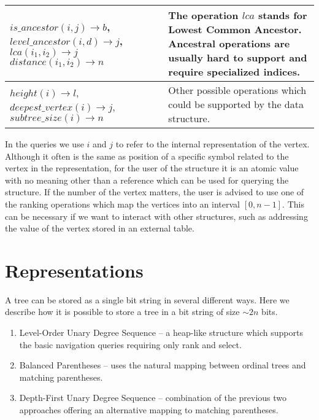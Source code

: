 \begin{tabularx}{\textwidth}{|L{0.7}|L{1.3}|}
	$is\_ancestor(i, j) \rightarrow b$, \newline
	$level\_ancestor(i, d) \rightarrow j$, \newline
	$lca(i_1, i_2) \rightarrow j$
	$distance(i_1, i_2) \rightarrow n$
	& The operation $lca$ stands for Lowest Common Ancestor.
	Ancestral operations are usually hard to support and require specialized indices. \\ \hline
	
	$height(i) \rightarrow l$, \newline
	$deepest\_vertex(i) \rightarrow j$, \newline
	$subtree\_size(i) \rightarrow n$
	& Other possible operations which could be supported by the data structure. \\ \hline
\end{tabularx}

In the queries we use $i$ and $j$ to refer to the internal representation of the vertex.
Although it often is the same as position of a specific symbol related to the vertex in the representation, for the user of the structure it is an atomic value with no meaning other than a reference which can be used for querying the structure.
If the number of the vertex matters, the user is advised to use one of the ranking operations which map the vertices into an interval $[0, n-1]$.
This can be necessary if we want to interact with other structures, such as addressing the value of the vertex stored in an external table.

\section{Representations}

A tree can be stored as a single bit string in several different ways.
Here we describe how it is possible to store a tree in a bit string of size $\sim 2n$ bits.
\begin{enumerate}
	\item Level-Order Unary Degree Sequence -- a heap-like structure which supports the basic navigation queries requiring only rank and select.
	\item Balanced Parentheses -- uses the natural mapping between ordinal trees and matching parentheses.
	\item Depth-First Unary Degree Sequence -- combination of the previous two approaches offering an alternative mapping to matching parentheses.
\end{enumerate}


